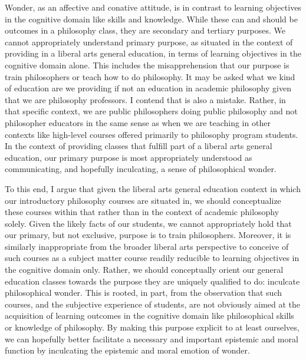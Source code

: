 \documentclass[letterpaper,notitlepage,12pt]{article}
\begin{document}
Wonder, as an affective and conative attitude, is in contrast to learning
objectives in the cognitive domain like skills and knowledge.
While these can and should be outcomes in a philosophy class, they are secondary
and tertiary purposes.
We cannot appropriately understand primary purpose, as situated in the context
of providing in a liberal arts general education, in terms of learning
objectives in the cognitive domain alone.
This includes the misapprehension that our purpose is train philosophers or
teach how to do philosophy.
It may be asked what we kind of education are we providing if not an
education in academic philosophy given that we are philosophy professors.
I contend that is also a mistake.
Rather, in that specific context, we are public philosophers doing public
philosophy and not philosopher educators in the same sense as when we are
teaching in other contexts like high-level courses offered primarily to
philosophy program students.
In the context of providing classes that fulfill part of a liberal arts general
education, our primary purpose is most appropriately understood as
communicating, and hopefully inculcating, a sense of philosophical wonder.

To this end, I argue that given the liberal arts general education context in
which our introductory philosophy courses are situated in, we should
conceptualize these courses within that rather than in the context of academic
philosophy solely.
Given the likely facts of our students, we cannot appropriately hold that our
primary, but not exclusive, purpose is to train philosophers.
Moreover, it is similarly inappropriate from the broader liberal arts
perspective to conceive of such courses as a subject matter course readily
reducible to learning objectives in the cognitive domain only.
Rather, we should conceptually orient our general education classes towards the
purpose they are uniquely qualified to do: inculcate philosophical wonder.
This is rooted, in part, from the observation that such courses, and the
subjective experience of students, are not obviously aimed at the acquisition of
learning outcomes in the cognitive domain like philosophical skills or knowledge
of philosophy.
By making this purpose explicit to at least ourselves, we can hopefully better
facilitate a necessary and important epistemic and moral function by inculcating
the epistemic and moral emotion of wonder.
\end{document}
